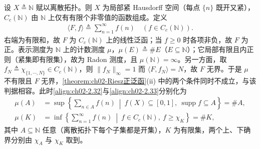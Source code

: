 \documentclass[../../main.tex]{subfiles}%
\begin{document}
\begin{example}\label{example:ch02-Riesz计数测度}
设 $X\triangleq\mathbb N$ 赋以离散拓扑。则 $X$ 为局部紧 Hausdorff 空间（每点 $\{n\}$ 既开又紧），$C_c(\mathbb N)$ 由 $\mathbb N$ 上仅有有限个非零值的函数组成。定义
\begin{align*}
\langle F,f\rangle\triangleq\sum_{n=1}^\infty f(n)\quad(f\in C_c(\mathbb N)).
\end{align*}
右端为有限和，故 $F$ 为 $C_c(\mathbb N)$ 上的线性泛函；当 $f\geqslant0$ 时各项非负，故 $F$ 为正。表示测度为 $\mathbb N$ 上的计数测度 $\mu$，$\mu(E)\triangleq\#E$（$E\subseteq\mathbb N$）；它局部有限且内正则（紧集即有限集），故为 Radon 测度，且 $\mu(\mathbb N)=\infty$。另一方面，取 $f_N\triangleq\chi_{\{1,\cdots,N\}}\in C_c(\mathbb N)$，则 $\|f_N\|_\infty=1$ 而 $\langle F,f_N\rangle=N$，故 $F$ 无界。于是 $\mu$ 不有限且 $F$ 无界，\cref{theorem:ch02-Riesz正泛函}(ii) 中的两个条件同时不成立，与该判据相容。此时\eqref{align:ch02-2.32}与\eqref{align:ch02-2.33}分别化为
\begin{align*}
\mu(A)&=\sup\left\{\sum_{n\in A}f(n)\ \middle|\ f(X)\subseteq[0,1],\ \operatorname{supp}f\subseteq A\right\}=\#A,\\
\mu(K)&=\inf\left\{\sum_{n=1}^\infty f(n)\ \middle|\ f\in C_c(\mathbb N),\ f\geqslant\chi_K\right\}=\#K,
\end{align*}
其中 $A\subseteq\mathbb N$ 任意（离散拓扑下每个子集都是开集），$K$ 为有限集，两个上、下确界分别由 $\chi_A$ 与 $\chi_K$ 取到。
\end{example}
\end{document}
